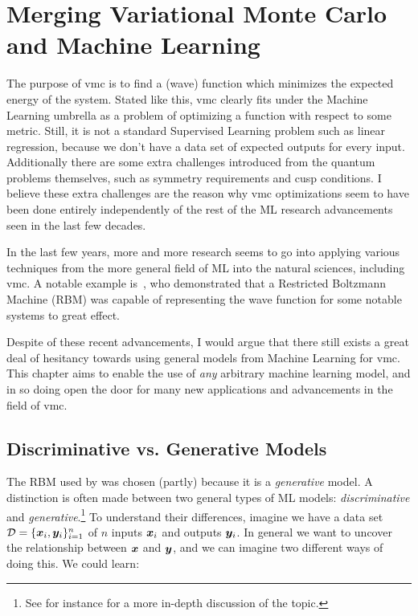 \documentclass[Thesis.tex]{subfiles}
\begin{document}
\chapter{Merging Variational Monte Carlo and Machine Learning}
\label{chp:mergin-vmc-with-ml}

The purpose of \acrlong{vmc} is to find a (wave) function which
minimizes the expected energy of the system. Stated like this, \gls{vmc} clearly fits
under the Machine Learning umbrella as a problem of optimizing a function with
respect to some metric. Still, it is not a standard Supervised Learning problem
such as linear regression, because we don't have a data set of expected outputs
for every input. Additionally there are some extra challenges introduced from
the quantum problems themselves, such as symmetry requirements and cusp
conditions. I believe these extra challenges are the reason why \gls{vmc}
optimizations seem to have been done entirely independently of the rest of the
ML research advancements seen in the last few decades.

In the last few years, more and more research seems to go into applying various
techniques from the more general field of ML into the natural sciences,
including \gls{vmc}. A notable example is~\textcite{Carleo602}, who demonstrated that
a Restricted Boltzmann Machine (RBM) was capable of representing the wave
function for some notable systems to great effect.

Despite of these recent advancements, I would argue that there
still exists a great deal of hesitancy towards using general models from Machine
Learning for \gls{vmc}. This chapter aims to enable the use of \emph{any} arbitrary
machine learning model, and in so doing open the door for many new applications
and advancements in the field of \gls{vmc}.


\section{Discriminative vs. Generative Models}


The RBM used by \textcite{Carleo602} was chosen (partly) because it is a
\emph{generative} model. A distinction is often made between two general types
of ML models:
\emph{discriminative} and \emph{generative}.\footnote{See for instance \textcite{Ng-2001} for
a more in-depth discussion of the topic.} To understand their differences,
imagine we have a data set $\mathcal{D} = \{\bm{x}_i, \bm{y}_i\}_{i=1}^n$ of $n$
inputs $\bm{x}_i$ and outputs $\bm{y}_i$. In general we want to uncover the
relationship between $\bm{x}$ and $\bm{y}$, and we can imagine two different ways of
doing this. We could learn:
\end{document}
